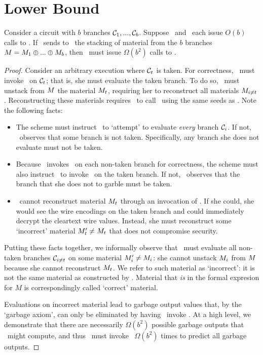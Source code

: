 \section{Lower Bound}\label{sec:lowerbound}
\begin{theorem}
Consider a circuit with $b$ branches $\mathcal C_1,..., \mathcal C_b$.  Suppose
\Eval\ and \Gen\ each issue
$O(b)$ calls to \Gb. If \Gen\ sends to \Eval\ the stacking of material from
the $b$ branches $M = M_1 \oplus ... \oplus M_b$, then \Gen\ must issue $\Omega(b^2)$  calls to \Ev.
\end{theorem}
\begin{proof}
Consider an arbitrary execution where $\mathcal C_t$  is taken.
For correctness, \Eval\ must invoke \Ev\ on $\mathcal C_t$; that is, she
must evaluate the taken branch.
To do so, \Eval\ must unstack from $M$ the material $M_t$,
requiring her to reconstruct all materials $M_{i\neq t}$.
Reconstructing these materials requires \Eval\ to call \Gb\ using the
same seeds as \Gen.
%
Note the following facts:
\begin{itemize}
  \item
    The scheme must instruct \Eval\ to `attempt' to
    evaluate \emph{every} branch $\mathcal C_i$. If not,
    \Eval\ observes that some branch is not taken.
    Specifically, any branch she does not evaluate must not be
    taken.
  \item
    Because \Eval\ invokes \Gb\ on each non-taken branch for
    correctness, the scheme must also instruct \Eval\ to invoke \Gb\ on the taken branch.
    If not, \Eval\ observes that the branch that she does not to
    garble must be taken.
  \item
    \Eval\ cannot reconstruct material $M_t$
    through an invocation of \Gb. If she could, she would
    see the wire encodings on the taken branch and could immediately
    decrypt the cleartext wire values.
    Instead, she must reconstruct some `incorrect' material $M_t'
    \neq M_t$ that does not compromise security.
\end{itemize}
Putting these facts together, we informally observe that
\Eval\ must evaluate all non-taken branches $\mathcal C_{i\neq t}$ on some
material $M_i' \neq M_i$: she cannot unstack $M_i$
from $M$ because she cannot reconstruct $M_t$.
%
We refer to such material as `incorrect': it is not the same material
as constructed by \Gen.
Material that \emph{is} in the formal expresion for $M$ is correspondingly called
`correct' material.

Evaluations on incorrect material lead to garbage output values that,
by the `garbage axiom', can only be eliminated by having \Gen\ invoke
\Ev.
At a high level, we demonstrate that there are
necessarily $\Omega(b^2)$ possible garbage outputs that \Eval\ might
compute, and thus \Gen\ must invoke \Ev\ $\Omega(b^2)$ times to
predict all garbage outputs.


\end{proof}

